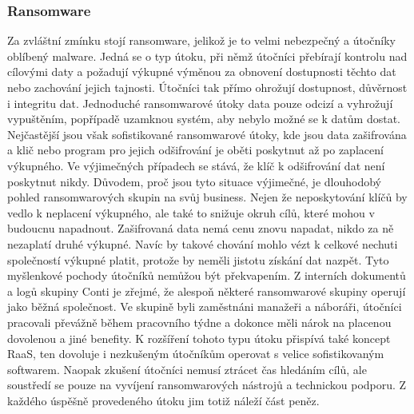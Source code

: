 \subsubsection{Ransomware}
Za zvláštní zmínku stojí ransomware, jelikož je to velmi nebezpečný a útočníky oblíbený malware.
Jedná se o typ útoku, při němž útočníci přebírají kontrolu nad cílovými daty a požadují výkupné výměnou za obnovení dostupnosti těchto dat nebo zachování jejich tajnosti.
Útočníci tak přímo ohrožují dostupnost, důvěrnost i integritu dat.
Jednoduché ransomwarové útoky data pouze odcizí a vyhrožují vypuštěním, popřípadě uzamknou systém, aby nebylo možné se k datům dostat.
Nejčastější jsou však sofistikované ransomwarové útoky, kde jsou data zašifrována a klič nebo program pro jejich odšifrování je oběti poskytnut až po zaplacení výkupného.
Ve výjimečných případech se stává, že klíč k odšifrování dat není poskytnut nikdy.
Důvodem, proč jsou tyto situace výjimečné, je dlouhodobý pohled ransomwarových skupin na svůj business.
Nejen že neposkytování klíčů by vedlo k neplacení výkupného, ale také to snižuje okruh cílů, které mohou v budoucnu napadnout.
Zašifrovaná data nemá cenu znovu napadat, nikdo za ně nezaplatí druhé výkupné.
Navíc by takové chování mohlo vézt k celkové nechuti společností výkupné platit, protože by neměli jistotu získání dat nazpět.
Tyto myšlenkové pochody útočníků nemůžou být překvapením.
Z interních dokumentů a logů skupiny Conti je zřejmé, že alespoň některé ransomwarové skupiny operují jako běžná společnost\cite{Conti_logs}.
Ve skupině byli zaměstnáni manažeři a náboráři, útočníci pracovali převážně během pracovního týdne a dokonce měli nárok na placenou dovolenou a jiné benefity.
K rozšíření tohoto typu útoku přispívá také koncept \ac{RaaS}, ten dovoluje i nezkušeným útočníkům operovat s velice sofistikovaným softwarem.
Naopak zkušení útočníci nemusí ztrácet čas hledáním cílů, ale soustředí se pouze na vyvíjení ransomwarových nástrojů a technickou podporu.
Z každého úspěšně provedeného útoku jim totiž náleží část peněz.\cite{Enisa_thread_landscape}


~

